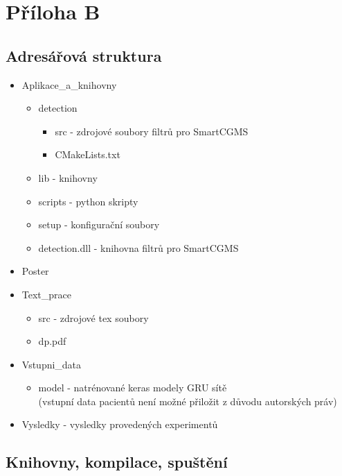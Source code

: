 \chapter*{Příloha B}

\section*{Adresářová struktura}

\begin{itemize}
\item Aplikace\_a\_knihovny
 \begin{itemize}
  \item detection
  \begin{itemize}
  \item src - zdrojové soubory filtrů pro SmartCGMS
  \item CMakeLists.txt
  \end{itemize}
 \item lib - knihovny
 \item scripts - python skripty
 \item setup - konfigurační soubory
 \item detection.dll - knihovna filtrů pro SmartCGMS
 \end{itemize}
\item Poster
\item Text\_prace
 \begin{itemize}
  \item src - zdrojové tex soubory
  \item dp.pdf
  \end{itemize}
\item Vstupni\_data

 \begin{itemize}
  \item model - natrénované keras modely GRU sítě\\(vstupní data pacientů není možné přiložit z důvodu autorských práv)
  \end{itemize}
\item Vysledky - vysledky provedených experimentů
\end{itemize}

\section*{Knihovny, kompilace, spuštění}

